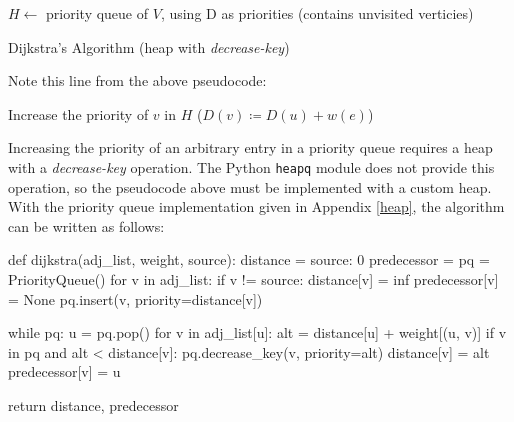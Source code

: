 \documentclass[12pt, titlepage]{article}
\begin{document}
\begin{algorithm}[H]
  \SetAlgoLined
  \DontPrintSemicolon
  $H \longleftarrow$\hspace{0.5mm} priority queue of $V$, using D as priorities\;
  \hspace{13mm}(contains unvisited verticies)\;
  \;
    \caption{Dijkstra's Algorithm (heap with \textit{decrease-key})}
\end{algorithm} \medskip

Note this line from the above pseudocode:
\begin{center}
    Increase the priority of $v$ in $H$\hspace{4mm} ($D(v)\coloneqq D(u) + w(e)$)
\end{center}
Increasing the priority of an arbitrary entry in a priority queue requires a heap with a \textit{decrease-key} operation. The Python \texttt{heapq} module does not provide this operation, so the pseudocode above must be implemented with a custom heap. With the priority queue implementation given in Appendix \ref{heap}, the algorithm can be written as follows: \medskip

\begin{python}
def dijkstra(adj_list, weight, source):
    distance = {source: 0}
    predecessor = {}
    pq = PriorityQueue()
    for v in adj_list:
        if v != source:
            distance[v] = inf
            predecessor[v] = None
        pq.insert(v, priority=distance[v])

    while pq:
        u = pq.pop()
        for v in adj_list[u]:
            alt = distance[u] + weight[(u, v)]
            if v in pq and alt < distance[v]:
                pq.decrease_key(v, priority=alt)
                distance[v] = alt
                predecessor[v] = u

    return distance, predecessor
\end{python}
\end{document}
